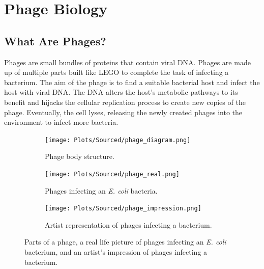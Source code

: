 \section{Phage Biology}
\subsection{What Are Phages?}
Phages are small bundles of proteins that contain viral DNA. 
Phages are made up of multiple parts built like LEGO to complete the task of infecting a bacterium. 
The aim of the phage is to find a suitable bacterial host and infect the host with viral DNA. 
The DNA alters the host's metabolic pathways to its benefit and hijacks the cellular replication process to create new copies of the phage. 
Eventually, the cell lyses, releasing the newly created phages into the environment to infect more bacteria. 
\begin{figure}[!ht]
    \centering
    \begin{subfigure}{0.25\linewidth}
        \centering
        \texttt{[image: Plots/Sourced/phage\_diagram.png]}
        \caption{
            Phage body structure. 
        }
        \label{fig:plots:sourced:phage_diagram}
    \end{subfigure}
    \hfill
    \begin{subfigure}{0.3\linewidth}
        \centering
        \texttt{[image: Plots/Sourced/phage\_real.png]}
        \caption{
            Phages infecting an \textit{E. coli} bacteria. 
        }
        \label{fig:plots:sourced:phage_real}
    \end{subfigure}
    \hfill
    \begin{subfigure}{0.35\linewidth}
        \centering
        \texttt{[image: Plots/Sourced/phage\_impression.png]}
        \caption{
            Artist representation of phages infecting a bacterium. 
        }
        \label{fig:plots:sourced:phage_impression}
    \end{subfigure}
    \caption{Parts of a phage, a real life picture of phages infecting an \textit{E. coli} bacterium, and an artist's impression of phages infecting a bacterium. }
\end{figure}

